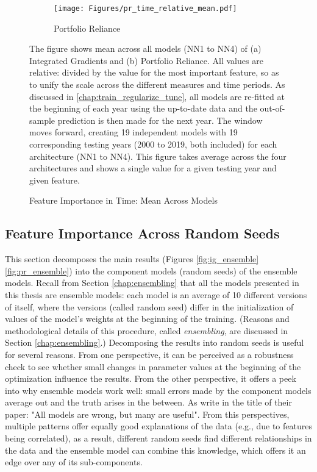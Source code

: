 {\begin{figure}
			\begin{subfigure}[t]{\textwidth}
				\centering
				\texttt{[image: Figures/pr\_time\_relative\_mean.pdf]}
				\caption{Portfolio Reliance}
				\label{fig:pr_time_mean}
			\end{subfigure}
			\caption{Feature Importance in Time: Mean Across Models}
			\label{fig:time_mean}
			\medskip
			\small
			The figure shows mean across all models (NN1 to NN4) of (a) Integrated Gradients and (b) Portfolio Reliance. All values are relative: divided by the value for the most important feature, so as to unify the scale across the different measures and time periods. As discussed in \ref{chap:train_regularize_tune}, all models are re-fitted at the beginning of each year using the up-to-date data and the out-of-sample prediction is then made for the next year. The window moves forward, creating 19 independent models with 19 corresponding testing years (2000 to 2019, both included) for each architecture (NN1 to NN4). This figure takes average across the four architectures and shows a single value for a given testing year and given feature. 
		\end{figure}
	
	\subsection{Feature Importance Across Random Seeds}
	
		This section decomposes the main results (Figures \ref{fig:ig_ensemble} \ref{fig:pr_ensemble}) into the component models (random seeds) of the ensemble models. Recall from Section \ref{chap:ensembling} that all the models presented in this thesis are ensemble models: each model is an average of 10 different versions of itself, where the versions (called random seed) differ in the initialization of values of the model's weights at the beginning of the training. (Reasons and methodological details of this procedure, called \textit{ensembling}, are discussed in Section \ref{chap:ensembling}.) Decomposing the results into random seeds is useful for several reasons. From one perspective, it can be perceived as a robustness check to see whether small changes in parameter values at the beginning of the optimization influence the results. From the other perspective, it offers a peek into why ensemble models work well: small errors made by the component models average out and the truth arises in the between. As \cite{fisher2019all} write in the title of their paper: "All models are wrong, but many are useful". From this perspectives, multiple patterns offer equally good explanations of the data (e.g., due to features being correlated), as a result, different random seeds find different relationships in the data and the ensemble model can combine this knowledge, which offers it an edge over any of its sub-components.
		
}
